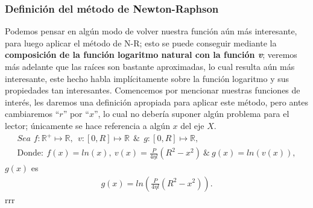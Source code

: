 \subsubsection{Definición del método de Newton-Raphson}

\vspace{0.5cm}
Podemos pensar en algún modo de volver nuestra función aún más interesante, para luego aplicar el método de N-R; esto se puede conseguir mediante la \textbf{composición de la función logaritmo natural con la función \textit{v}}; veremos más adelante que las raíces son bastante aproximadas, lo cual resulta aún más interesante, este hecho habla implícitamente sobre la función logaritmo y sus propiedades tan interesantes. Comencemos por mencionar nuestras funciones de interés, les daremos una definición apropiada para aplicar este método, pero antes cambiaremos ``$r$'' por ``$x$'', lo cual no debería suponer algún problema para el lector; únicamente se hace referencia a algún $x$ del eje $X$.
\begin{align*}
    \textit{Sea f}: \mathbb{R^{+}} \mapsto \mathbb{R},\ \ v: [0,R]\mapsto \mathbb{R}\ \ \& \ \ g: [0,R] \mapsto \mathbb{R},\\
    \text{Donde}: \ f(x)=ln(x),\ v(x)=\frac{P}{4\eta l}(R^{2}-x^{2})\ \& \ g(x)=ln(v(x)),
\end{align*}
$g(x)$ es
\begin{align*}
    g(x)=ln\left(\frac{P}{4\eta l}(R^{2}-x^{2})\right).
\end{align*}
rrr
